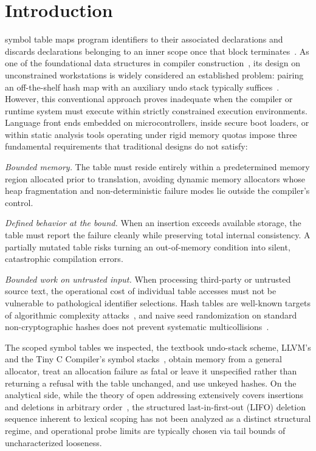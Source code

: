 \section{Introduction}
\label{sec:introduction}
 symbol table maps program identifiers to their associated declarations and discards declarations belonging to an inner scope once that block terminates~\cite{aho2006}. As one of the foundational data structures in compiler construction~\cite{graham1979}, its design on unconstrained workstations is widely considered an established problem: pairing an off-the-shelf hash map with an auxiliary undo stack typically suffices~\cite{appel1998}. However, this conventional approach proves inadequate when the compiler or runtime system must execute within strictly constrained execution environments. Language front ends embedded on microcontrollers, inside secure boot loaders, or within static analysis tools operating under rigid memory quotas impose three fundamental requirements that traditional designs do not satisfy:

\emph{Bounded memory.} The table must reside entirely within a predetermined memory region allocated prior to translation, avoiding dynamic memory allocators whose heap fragmentation and non-deterministic failure modes lie outside the compiler's control.

\emph{Defined behavior at the bound.} When an insertion exceeds available storage, the table must report the failure cleanly while preserving total internal consistency. A partially mutated table risks turning an out-of-memory condition into silent, catastrophic compilation errors.

\emph{Bounded work on untrusted input.} When processing third-party or untrusted source text, the operational cost of individual table accesses must not be vulnerable to pathological identifier selections. Hash tables are well-known targets of algorithmic complexity attacks~\cite{crosby2003}, and naive seed randomization on standard non-cryptographic hashes does not prevent systematic multicollisions~\cite{aumasson2012}.

The scoped symbol tables we inspected, the textbook undo-stack scheme, LLVM's  and the Tiny C Compiler's symbol stacks~\cite{appel1998,llvmsht,tcc}, obtain memory from a general allocator, treat an allocation failure as fatal or leave it unspecified rather than returning a refusal with the table unchanged, and use unkeyed hashes. On the analytical side, while the theory of open addressing extensively covers insertions and deletions in arbitrary order~\cite{knuth3,bender2021,fkk2024}, the structured last-in-first-out (LIFO) deletion sequence inherent to lexical scoping has not been analyzed as a distinct structural regime, and operational probe limits are typically chosen via tail bounds of uncharacterized looseness.

